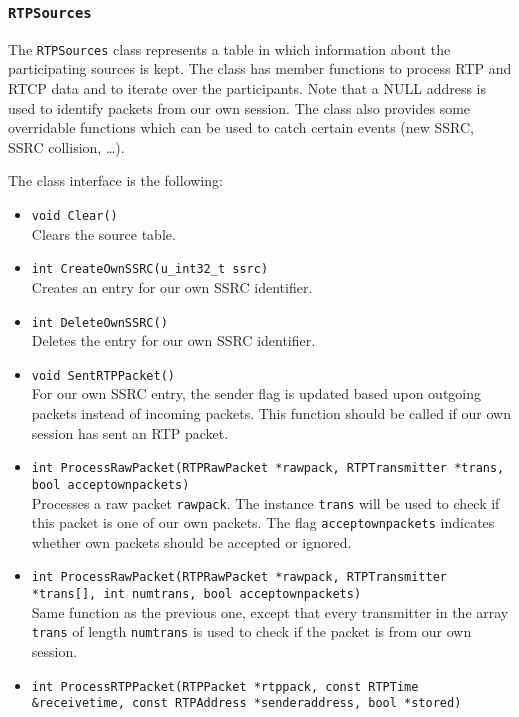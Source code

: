 \documentclass[12pt,a4paper]{article}
\newcommand{\headerfile}[1]{\marginpar{\scriptsize Header:\\{\tt #1}}}
\begin{document}
			\subsubsection{\tt RTPSources}\headerfile{rtpsources.h}
	
				The {\tt RTPSources} class represents a table in which information
				about the participating sources is kept. The class has member
				functions to process RTP and RTCP data and to iterate over the
				participants. Note that a NULL address is used to identify packets
				from our own session. The class also provides some overridable
				functions which can be used to catch certain events (new SSRC,
				SSRC collision, \ldots).
				
				The class interface is the following:
				\begin{itemize}
					\item {\tt void Clear()}\\
						Clears the source table.
					\item {\tt int CreateOwnSSRC(u\_int32\_t ssrc)}\\
						Creates an entry for our own SSRC identifier.
					\item {\tt int DeleteOwnSSRC()}\\
						Deletes the entry for our own SSRC identifier.
					\item {\tt void SentRTPPacket()}\\
						For our own SSRC entry, the sender flag is updated based
						upon outgoing packets instead of incoming packets. This
						function should be called if our own session has sent an
						RTP packet.
					\item {\tt int ProcessRawPacket(RTPRawPacket *rawpack, RTPTransmitter *trans, bool acceptownpackets)}\\
						Processes a raw packet {\tt rawpack}. The instance {\tt trans} will be used to
						check if this packet is one of our own packets. The flag {\tt acceptownpackets}
						indicates whether own packets should be accepted or ignored.
					\item {\tt int ProcessRawPacket(RTPRawPacket *rawpack, RTPTransmitter *trans[], int numtrans, bool acceptownpackets)}\\
						Same function as the previous one, except that every transmitter
						in the array {\tt trans} of length {\tt numtrans} is used
						to check if the packet is from our own session.
					\item {\tt int ProcessRTPPacket(RTPPacket *rtppack, const RTPTime \&receivetime, const RTPAddress *senderaddress, bool *stored)}\\

\end{itemize}
\end{document}
